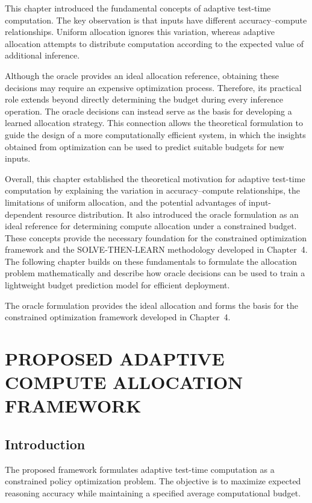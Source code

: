 \documentclass[12pt,a4paper,titlepage]{report}
\begin{document}
This chapter introduced the fundamental concepts of adaptive test-time computation. The key observation is that inputs have different accuracy--compute relationships. Uniform allocation ignores this variation, whereas adaptive allocation attempts to distribute computation according to the expected value of additional inference.

Although the oracle provides an ideal allocation reference, obtaining these decisions may require an expensive optimization process. Therefore, its practical role extends beyond directly determining the budget during every inference operation. The oracle decisions can instead serve as the basis for developing a learned allocation strategy. This connection allows the theoretical formulation to guide the design of a more computationally efficient system, in which the insights obtained from optimization can be used to predict suitable budgets for new inputs.

Overall, this chapter established the theoretical motivation for adaptive test-time computation by explaining the variation in accuracy--compute relationships, the limitations of uniform allocation, and the potential advantages of input-dependent resource distribution. It also introduced the oracle formulation as an ideal reference for determining compute allocation under a constrained budget. These concepts provide the necessary foundation for the constrained optimization framework and the SOLVE-THEN-LEARN methodology developed in Chapter~4. The following chapter builds on these fundamentals to formulate the allocation problem mathematically and describe how oracle decisions can be used to train a lightweight budget prediction model for efficient deployment.


The oracle formulation provides the ideal allocation and forms the basis for the constrained optimization framework developed in Chapter~4.

\chapter{PROPOSED ADAPTIVE COMPUTE ALLOCATION FRAMEWORK}

\section{Introduction}

The proposed framework formulates adaptive test-time computation as a constrained policy optimization problem. The objective is to maximize expected reasoning accuracy while maintaining a specified average computational budget.
\end{document}
